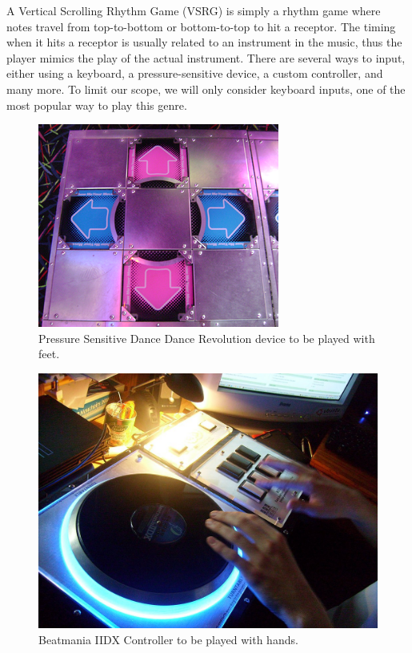 A Vertical Scrolling Rhythm Game (VSRG) is simply a rhythm game where notes travel from top-to-bottom or bottom-to-top to hit a receptor.
The timing when it hits a receptor is usually related to an instrument in the music, thus the player mimics the play of the actual instrument.
There are several ways to input, either using a keyboard, a pressure-sensitive device, a custom controller, and many more.
To limit our scope, we will only consider keyboard inputs, one of the most popular way to play this genre.

\begin{figure}[H]
    \centering
    \includegraphics[scale=0.5]{imgs/300px-Dance_Dance_Revolution_Extreme_arcade_machine_left_side_stage}
    \caption{Pressure Sensitive Dance Dance Revolution device to be played with feet.}
    \label{fig:ddr_pressure}
\end{figure}

\begin{figure}[H]
    \centering
    \includegraphics[scale=0.3]{imgs/1024px-Beatmania_IIDX_DAOPEE_Controller}
    \caption{Beatmania IIDX Controller to be played with hands.}
    \label{fig:iidx_controller}
\end{figure}


